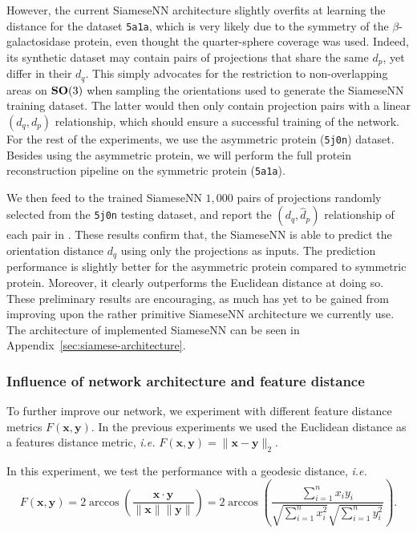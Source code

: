 However, the current SiameseNN architecture slightly overfits at learning the distance for the dataset \texttt{5a1a}, which is very likely due to the symmetry of the $\beta$-galactosidase protein, even thought the quarter-sphere coverage was used.
Indeed, its synthetic dataset may contain pairs of projections that share the same $d_p$, yet differ in their $d_q$.
This simply advocates for the restriction to non-overlapping areas on $\mathrm{\mathbf{SO}}(3)$ when sampling the orientations used to generate the SiameseNN training dataset.
The latter would then only contain projection pairs with a linear $(d_q,d_p)$ relationship, which should ensure a successful training of the network.
For the rest of the experiments, we use the asymmetric protein (\texttt{5j0n}) dataset. Besides using the asymmetric protein, we will perform the full protein reconstruction pipeline on the symmetric protein (\texttt{5a1a}).

We then feed to the trained SiameseNN $1,000$ pairs of projections randomly selected from the \texttt{5j0n} testing dataset, and report the $(d_q,\widehat{d}_p)$ relationship of each pair in .
These results confirm that, the SiameseNN is able to predict the orientation distance $d_q$ using only the projections as inputs. The prediction performance is slightly better for the asymmetric protein compared to symmetric protein.
Moreover, it clearly outperforms the Euclidean distance at doing so.
These preliminary results are encouraging, as much has yet to be gained from improving upon the rather primitive SiameseNN architecture we currently use. The architecture of implemented SiameseNN can be seen in Appendix~\ref{sec:siamese-architecture}.

\subsubsection{Influence of network architecture and feature distance}


To further improve our network, we experiment with different feature distance metrics $F(\mathbf{x},\mathbf{y})$.
In the previous experiments we used the Euclidean distance as a features distance metric, \textit{i.e.} $F(\mathbf{x},\mathbf{y})=\lVert \mathbf{x}-\mathbf{y}\rVert_2$.

In this experiment, we test the performance with a geodesic distance, \textit{i.e.}
\begin{equation}
    F(\mathbf{x},\mathbf{y})=2 \arccos(\frac{\mathbf{x} \cdot \mathbf{y}}{\lVert \mathbf{x} \rVert \lVert \mathbf{y} \rVert}) = 2 \arccos(\frac{\sum_{i=1}^n x_i y_i}{\sqrt{\sum_{i=1}^n x_i^2}\sqrt{\sum_{i=1}^n y_i^2 }}).
    \label{eqn:geodesic-distance}
\end{equation}

